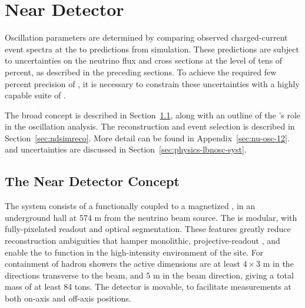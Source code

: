 \section{Near Detector}\label{sec:nu-osc-06}\label{sec:physics-lbnosc-ND}


Oscillation parameters are determined by comparing observed charged-current event spectra at the  to predictions from simulation. These predictions are subject to uncertainties on the neutrino flux and cross sections at the level of tens of percent, as described in the preceding sections. To achieve the required few percent precision of , it is necessary to constrain these uncertainties with a highly capable suite of .

The broad  concept is described in Section~\ref{sec:ndconcept}, along with an outline of the 's role in the oscillation analysis. The reconstruction and event selection is described in Section~\ref{sec:ndsimreco}. More detail can be found in Appendix~\ref{sec:nu-osc-12}.  and  uncertainties are discussed in Section~\ref{sec:physics-lbnosc-syst}.

\subsection{The Near Detector Concept}
\label{sec:ndconcept}

The   system consists of a 
functionally coupled to a magnetized ,  %
in an underground hall at  574 m from the neutrino beam source. The  is modular, with fully-\threed  pixelated readout and optical segmentation. These features greatly reduce reconstruction ambiguities that hamper monolithic, projective-readout , and enable the  to function in the high-intensity environment of the   site. For containment of hadron showers the active dimensions are at least $4 \times 3$ m in the directions transverse to the beam, and 5 m in the beam direction, giving a total mass of at least 84 tons. The  detector is movable, to facilitate measurements at both on-axis and off-axis positions.

